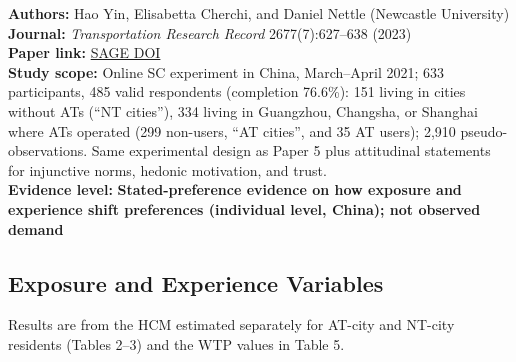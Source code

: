 \documentclass[10pt,a4paper]{article}
\begin{document}
\textbf{Authors:} Hao Yin, Elisabetta Cherchi, and Daniel Nettle (Newcastle University)\\
\textbf{Journal:} \emph{Transportation Research Record} 2677(7):627--638 (2023)\\
\textbf{Paper link:} \href{https://doi.org/10.1177/03611981231155181}{SAGE DOI}\\
\textbf{Study scope:} Online SC experiment in China, March--April 2021; 633 participants, 485 valid respondents (completion 76.6\%): 151 living in cities without ATs (``NT cities''), 334 living in Guangzhou, Changsha, or Shanghai where ATs operated (299 non-users, ``AT cities'', and 35 AT users); 2,910 pseudo-observations. Same experimental design as Paper 5 plus attitudinal statements for injunctive norms, hedonic motivation, and trust.\\
\textbf{Evidence level:} \textbf{Stated-preference evidence on how exposure and experience shift preferences (individual level, China); not observed demand}

\hypertarget{exposure-and-experience-variables}{%
\subsection{Exposure and Experience Variables}\label{exposure-and-experience-variables}}

Results are from the HCM estimated separately for AT-city and NT-city residents (Tables 2--3) and the WTP values in Table 5.
\end{document}
